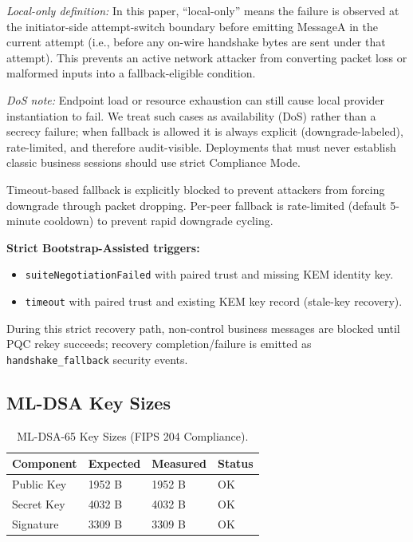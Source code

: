 \documentclass[10pt,journal,compsoc]{IEEEtran}
\providecommand{\tightlist}{%
	  \setlength{\itemsep}{0pt}\setlength{\parskip}{0pt}}
\begin{document}
\noindent\textit{Local-only definition:} In this paper, ``local-only''
means the failure is observed at the initiator-side attempt-switch
boundary before emitting MessageA in the current attempt (i.e., before
any on-wire handshake bytes are sent under that attempt). This prevents
an active network attacker from converting packet loss or malformed
inputs into a fallback-eligible condition.

\noindent\textit{DoS note:} Endpoint load or resource exhaustion can
still cause local provider instantiation to fail. We treat such cases as
availability (DoS) rather than a secrecy failure; when fallback is
allowed it is always explicit (downgrade-labeled), rate-limited, and
therefore audit-visible. Deployments that must never establish classic
business sessions should use strict Compliance Mode.

Timeout-based fallback is explicitly blocked to prevent attackers from
forcing downgrade through packet dropping. Per-peer fallback is
rate-limited (default 5-minute cooldown) to prevent rapid downgrade
cycling.

\textbf{Strict Bootstrap-Assisted triggers:}
\begin{itemize}\tightlist
\item \texttt{suiteNegotiationFailed} with paired trust and missing KEM identity key.
\item \texttt{timeout} with paired trust and existing KEM key record (stale-key recovery).
\end{itemize}
During this strict recovery path, non-control business messages are
blocked until PQC rekey succeeds; recovery completion/failure is emitted
as \texttt{handshake\_fallback} security events.

\subsection*{ML-DSA Key Sizes}

\begin{table}[!tp]
\centering
\caption{ML-DSA-65 Key Sizes (FIPS 204 Compliance).}
\label{tab:supp-ml-dsa-key-sizes}
\begin{tabular}{@{}llll@{}}
\toprule
Component & Expected & Measured & Status \\
\midrule
Public Key & 1952 B & 1952 B & OK \\
Secret Key & 4032 B & 4032 B & OK \\
Signature & 3309 B & 3309 B & OK \\
\bottomrule
\end{tabular}
\end{table}
\end{document}
